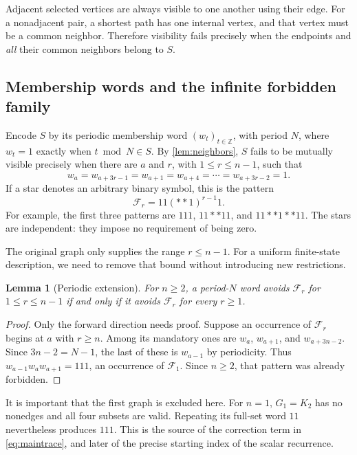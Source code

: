 \documentclass[11pt,a4paper]{article}
\newtheorem{lemma}[theorem]{Lemma}
\theoremstyle{definition}
\newcommand{\Z}{\mathbb Z}
\begin{document}
Adjacent selected vertices are always visible to one another using their
edge. For a nonadjacent pair, a shortest path has one internal vertex, and
that vertex must be a common neighbor. Therefore visibility fails precisely
when the endpoints and \emph{all} their common neighbors belong to $S$.

\subsection{Membership words and the infinite forbidden family}

Encode $S$ by its periodic membership word $(w_t)_{t\in\Z}$, with period $N$,
where $w_t=1$ exactly when $t\bmod N\in S$. By \cref{lem:neighbors}, $S$ fails
to be mutually visible precisely when there are $a$ and $r$, with
$1\le r\le n-1$, such that
\begin{equation}
 w_a=w_{a+3r-1}=w_{a+1}=w_{a+4}=\cdots=w_{a+3r-2}=1.
 \label{eq:obstruction}
\end{equation}
If a star denotes an arbitrary binary symbol, this is the pattern
\begin{equation}
 \mathcal F_r=11(\ast\ast1)^{r-1}1.
 \label{eq:forbidden}
\end{equation}
For example, the first three patterns are
$111$, $11\ast\ast11$, and $11\ast\ast1\ast\ast11$.
The stars are independent: they impose no requirement of being zero.

The original graph only supplies the range $r\le n-1$. For a uniform
finite-state description, we need to remove that bound without introducing
new restrictions.

\begin{lemma}[Periodic extension]
\label{lem:extension}
For $n\ge2$, a period-$N$ word avoids $\mathcal F_r$ for
$1\le r\le n-1$ if and only if it avoids $\mathcal F_r$ for every $r\ge1$.
\end{lemma}

\begin{proof}
Only the forward direction needs proof. Suppose an occurrence of
$\mathcal F_r$ begins at $a$ with $r\ge n$. Among its mandatory ones are
$w_a$, $w_{a+1}$, and $w_{a+3n-2}$. Since $3n-2=N-1$, the last of these
is $w_{a-1}$ by periodicity. Thus $w_{a-1}w_aw_{a+1}=111$, an occurrence
of $\mathcal F_1$. Since $n\ge2$, that pattern was already forbidden.
\end{proof}

It is important that the first graph is excluded here. For $n=1$, $G_1=K_2$
has no nonedges and all four subsets are valid. Repeating its full-set word
$11$ nevertheless produces $111$. This is the source of the correction
term in \cref{eq:maintrace}, and later of the precise starting index of the
scalar recurrence.
\end{document}
